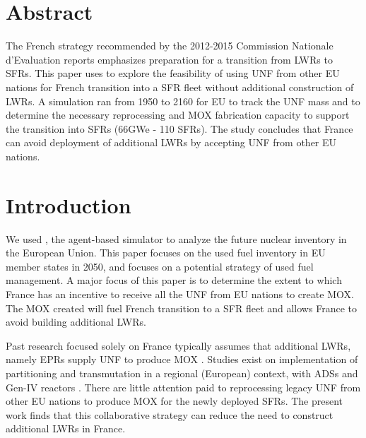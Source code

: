 \section{Abstract}
The French strategy recommended by the 2012-2015 Commission Nationale d'Evaluation reports
\cite{noauthor_cne2_nodate} emphasizes preparation for a transition from \glspl{LWR} to \glspl{SFR}.
This paper uses \Cyclus to explore the feasibility of using \gls{UNF} from other EU nations
for French transition into a \gls{SFR} fleet without additional construction of \glspl{LWR}.
A \Cyclus simulation ran from 1950 to 2160 for EU to track the \gls{UNF} mass
and to determine the necessary reprocessing and \gls{MOX} fabrication capacity to support
the transition into \glspl{SFR} (66GWe - 110 \glspl{SFR}). The study concludes that France can avoid deployment
of additional \glspl{LWR} by accepting \gls{UNF} from other EU nations.


\section{Introduction}
We used \Cyclus, the agent-based simulator \cite{huff_fundamental_2016} to analyze
the future nuclear inventory in the European Union. This paper focuses on the used fuel
inventory in \gls{EU} member states in 2050, and focuses on a potential strategy of used fuel
management.
A major focus of this paper is to determine the extent to which France has an incentive
to receive all the \gls{UNF} from \gls{EU} nations to create \gls{MOX}.
The \gls{MOX} created will fuel French transition to a \gls{SFR} fleet
and allows France to avoid building additional \glspl{LWR}.

Past research focused solely on France typically assumes that additional \glspl{LWR},
namely \glspl{EPR} supply \gls{UNF} to produce \gls{MOX} \cite{carre_overview_2009, martin_symbiotic_2017, freynet_multiobjective_2016}.
Studies exist on implementation of partitioning and transmutation
in a regional (European) context, with \glspl{ADS} and Gen-IV reactors \cite{fazio_study_2013}.
There are little attention paid to reprocessing legacy \gls{UNF} from other
EU nations to produce \gls{MOX} for the newly deployed \glspl{SFR}.
The present work finds that this collaborative strategy can reduce the
need to construct additional \glspl{LWR} in France.

